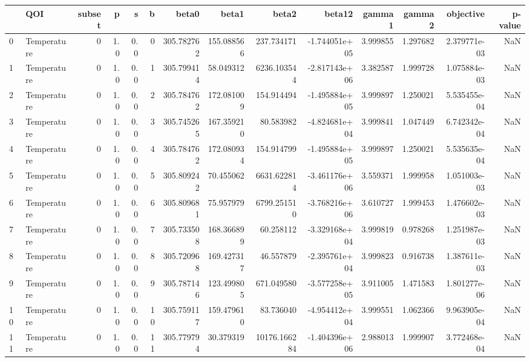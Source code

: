 \begin{tabular}{llrrrrrrrrrrrr}
\toprule
{} &          QOI &  subset &    p &    s &    b &       beta0 &        beta1 &          beta2 &        beta12 &    gamma1 &    gamma2 &     objective &  p-value \\
\midrule
0   &  Temperature &       0 &  1.0 &  0.0 &    0 &  305.782762 &   155.088566 &     237.734171 & -1.744051e+05 &  3.999855 &  1.297682 &  2.379771e-03 &      NaN \\
1   &  Temperature &       0 &  1.0 &  0.0 &    1 &  305.799414 &    58.049312 &    6236.103544 & -2.817143e+06 &  3.382587 &  1.999728 &  1.075884e-03 &      NaN \\
2   &  Temperature &       0 &  1.0 &  0.0 &    2 &  305.784762 &   172.081009 &     154.914494 & -1.495884e+05 &  3.999897 &  1.250021 &  5.535455e-04 &      NaN \\
3   &  Temperature &       0 &  1.0 &  0.0 &    3 &  305.745265 &   167.359210 &      80.583982 & -4.824681e+04 &  3.999841 &  1.047449 &  6.742342e-04 &      NaN \\
4   &  Temperature &       0 &  1.0 &  0.0 &    4 &  305.784762 &   172.080934 &     154.914799 & -1.495884e+05 &  3.999897 &  1.250021 &  5.535635e-04 &      NaN \\
5   &  Temperature &       0 &  1.0 &  0.0 &    5 &  305.809242 &    70.455062 &    6631.622814 & -3.461176e+06 &  3.559371 &  1.999958 &  1.051003e-03 &      NaN \\
6   &  Temperature &       0 &  1.0 &  0.0 &    6 &  305.809681 &    75.957979 &    6799.251510 & -3.768216e+06 &  3.610727 &  1.999453 &  1.476602e-03 &      NaN \\
7   &  Temperature &       0 &  1.0 &  0.0 &    7 &  305.733508 &   168.366899 &      60.258112 & -3.329168e+04 &  3.999819 &  0.978268 &  1.251987e-03 &      NaN \\
8   &  Temperature &       0 &  1.0 &  0.0 &    8 &  305.720968 &   169.427317 &      46.557879 & -2.395761e+04 &  3.999823 &  0.916738 &  1.387611e-03 &      NaN \\
9   &  Temperature &       0 &  1.0 &  0.0 &    9 &  305.787146 &   123.499805 &     671.049580 & -3.577258e+05 &  3.911005 &  1.471583 &  1.801277e-06 &      NaN \\
10  &  Temperature &       0 &  1.0 &  0.0 &   10 &  305.759117 &   159.479610 &      83.736040 & -4.954412e+04 &  3.999551 &  1.062366 &  9.963905e-04 &      NaN \\
11  &  Temperature &       0 &  1.0 &  0.0 &   11 &  305.779794 &    30.379319 &   10176.166284 & -1.404396e+06 &  2.988013 &  1.999907 &  3.772468e-04 &      NaN \\

\end{tabular}
